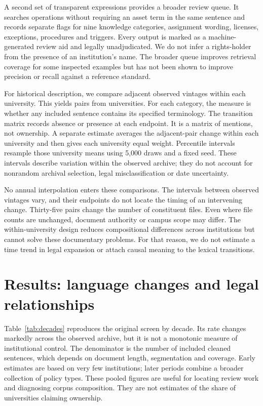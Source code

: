 \documentclass[12pt]{article}
\begin{document}
A second set of transparent expressions provides a broader review queue. It searches operations without requiring an asset term in the same sentence and records separate flags for nine knowledge categories, assignment wording, licenses, exceptions, procedures and triggers. Every output is marked as a machine-generated review aid and legally unadjudicated. We do not infer a rights-holder from the presence of an institution's name. The broader queue improves retrieval coverage for some inspected examples but has not been shown to improve precision or recall against a reference standard.

For historical description, we compare adjacent observed vintages within each university. This yields \Pairs{} pairs from \PairUniversities{} universities. For each category, the measure is whether any included sentence contains its specified terminology. The transition matrix records absence or presence at each endpoint. It is a matrix of mentions, not ownership. A separate estimate averages the adjacent-pair change within each university and then gives each university equal weight. Percentile intervals resample those university means using 5,000 draws and a fixed seed. These intervals describe variation within the observed archive; they do not account for nonrandom archival selection, legal misclassification or date uncertainty.

No annual interpolation enters these comparisons. The intervals between observed vintages vary, and their endpoints do not locate the timing of an intervening change. Thirty-five pairs change the number of constituent files. Even where file counts are unchanged, document authority or campus scope may differ. The within-university design reduces compositional differences across institutions but cannot solve these documentary problems. For that reason, we do not estimate a time trend in legal expansion or attach causal meaning to the lexical transitions.

\section{Results: language changes and legal relationships}
Table~\ref{tab:decades} reproduces the original screen by decade. Its rate changes markedly across the observed archive, but it is not a monotonic measure of institutional control. The denominator is the number of included cleaned sentences, which depends on document length, segmentation and coverage. Early estimates are based on very few institutions; later periods combine a broader collection of policy types. These pooled figures are useful for locating review work and diagnosing corpus composition. They are not estimates of the share of universities claiming ownership.
\end{document}
